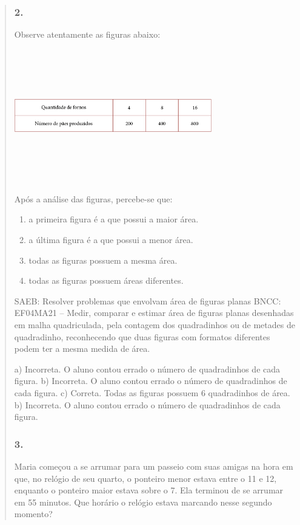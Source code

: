 \begin{enumerate}
\begin{escolha}
\begin{enumerate}
\begin{itemize}
\begin{itemize}
\begin{escolha}
\begin{quote}
\subsubsection{2.}\label{section-63}

Observe atentamente as figuras abaixo:

\includegraphics[width=3.39196in,height=2.27520in]{media/image71.png}

Após a análise das figuras, percebe-se que:

\begin{enumerate}
\def\labelenumi{\alph{enumi})}
\item
  a primeira figura é a que possui a maior área.
\item
  a última figura é a que possui a menor área.
\item
  todas as figuras possuem a mesma área.
\item
  todas as figuras possuem áreas diferentes.
\end{enumerate}

SAEB: Resolver problemas que envolvam área de figuras planas
BNCC: EF04MA21 -- Medir, comparar e estimar área de figuras planas desenhadas em malha quadriculada,
pela contagem dos quadradinhos ou de metades de quadradinho, reconhecendo que duas figuras
com formatos diferentes podem ter a mesma medida de área.

a) Incorreta. O aluno contou errado o número de quadradinhos de cada figura.
b) Incorreta. O aluno contou errado o número de quadradinhos de cada figura.
c) Correta. Todas as figuras possuem 6 quadradinhos de área.
b) Incorreta. O aluno contou errado o número de quadradinhos de cada figura.

\subsubsection{3.}\label{section-64}

Maria começou a se arrumar para um passeio com suas amigas na hora em
que, no relógio de seu quarto, o ponteiro menor estava entre o 11 e 12, enquanto o ponteiro maior estava sobre o 7. Ela terminou de se arrumar em 55 minutos. Que horário
o relógio estava marcando nesse segundo momento?


\end{quote}
\end{escolha}
\end{itemize}
\end{itemize}
\end{enumerate}
\end{escolha}
\end{enumerate}
